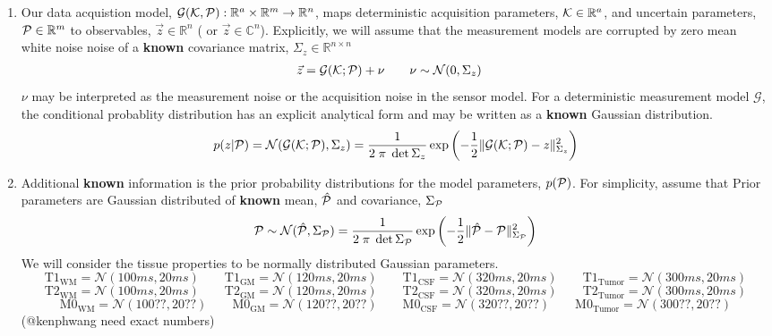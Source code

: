 \documentclass{article}         %
\theoremstyle{definition}
\theoremstyle{remark}
\begin{document}
\begin{enumerate}
  \item Our data acquistion model, $\mathcal{G}(\mathcal{K},\mathcal{P}): \mathbb{R}^a
\times \mathbb{R}^m \rightarrow \mathbb{R}^n $,
maps deterministic acquisition
parameters, $\mathcal{K} \in \mathbb{R}^a$, and uncertain parameters, $\mathcal{P} \in \mathbb{R}^m$
to observables, $\vec{z} \in \mathbb{R}^n$ ( or $\vec{z} \in \mathbb{C}^n$).
Explicitly, we will assume that the
measurement models are corrupted by zero mean white noise noise of a
\textbf{known} covariance matrix, $\Sigma_z \in \mathbb{R}^{n \times n}$ 
\begin{equation}
\label{sensormodelstructure}
\begin{split}
  \vec{z} & = \mathcal{G}(\mathcal{K};\mathcal{P}) + \nu   \qquad   \nu \sim \mathcal{N}(0,\Sigma_z)
     \end{split}
\end{equation}
$\nu$ may be interpreted as the measurement noise or the acquisition noise
in the sensor model. For a deterministic measurement model $\mathcal{G}$,
the conditional probablity distribution has an explicit analytical form
and may be written as a  \textbf{known} Gaussian
distribution. 
  \[ 
      p(z|\mathcal{P})   =  \mathcal{N}(\mathcal{G}(\mathcal{K};\mathcal{P}),\Sigma_z)  
                      =  \frac{1}{2 \; \pi \; \det{\Sigma_z}} \exp\left( - \frac{1}{2} \|\mathcal{G}(\mathcal{K};\mathcal{P})  - z \|^2_{\Sigma_z}\right)
  \]
  \item Additional \textbf{known} information is the prior probability
distributions for the model parameters, $p(\mathcal{P})$.  For simplicity,
    assume that Prior parameters are Gaussian distributed of 
   \textbf{known} mean, $\hat{\mathcal{P}}$ and covariance, $\Sigma_{\mathcal{P}}$
   \[
      \mathcal{P} \sim \mathcal{N} (\hat{\mathcal{P}}, \Sigma_{\mathcal{P}})
                      =  \frac{1}{2 \; \pi \; \det{\Sigma_{\mathcal{P}}}} \exp\left( 
          - \frac{1}{2} \|\hat{\mathcal{P}}  - \mathcal{P} \|^2_{\Sigma_{\mathcal{P}}}
                                                                  \right)
   \]
We will consider the tissue properties to be
normally distributed Gaussian parameters.
\[
  \text{T1}_\text{WM}    =  \mathcal{N}(100ms, 20ms)  \qquad
  \text{T1}_\text{GM}    =  \mathcal{N}(120ms, 20ms)  \qquad
  \text{T1}_\text{CSF}   =  \mathcal{N}(320ms, 20ms)  \qquad
  \text{T1}_\text{Tumor} =  \mathcal{N}(300ms, 20ms)
\]
\[
  \text{T2}_\text{WM}    =  \mathcal{N}(100ms, 20ms)  \qquad
  \text{T2}_\text{GM}    =  \mathcal{N}(120ms, 20ms)  \qquad
  \text{T2}_\text{CSF}   =  \mathcal{N}(320ms, 20ms)  \qquad
  \text{T2}_\text{Tumor} =  \mathcal{N}(300ms, 20ms)
\]
\[
  \text{M0}_\text{WM}    =  \mathcal{N}(100??, 20??)  \qquad
  \text{M0}_\text{GM}    =  \mathcal{N}(120??, 20??)  \qquad
  \text{M0}_\text{CSF}   =  \mathcal{N}(320??, 20??)  \qquad
  \text{M0}_\text{Tumor} =  \mathcal{N}(300??, 20??)
\]
{\color{red}(@kenphwang need exact numbers)}


\end{enumerate}
\end{document}
